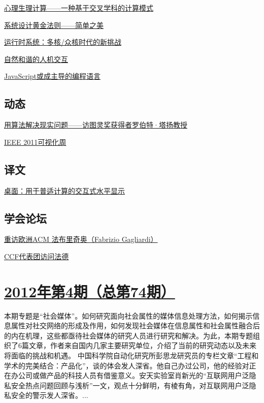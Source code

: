 \documentclass[a4paper]{article}
\begin{document}
\href{http://history.ccf.org.cn/resources/1190201776262/2012/05/18/12.pdf}{心理生理计算——一种基于交叉学科的计算模式}

\href{http://history.ccf.org.cn/resources/1190201776262/2012/05/18/9.pdf}{系统设计黄金法则——简单之美}

\href{http://history.ccf.org.cn/resources/1190201776262/2012/05/18/10.pdf}{运行时系统：多核/众核时代的新挑战}

\href{http://history.ccf.org.cn/resources/1190201776262/2012/05/18/11.pdf}{自然和谐的人机交互}

\href{http://history.ccf.org.cn/resources/1190201776262/2012/05/18/13.pdf}{JavaScript或成主导的编程语言}

\subsection{动态}
\href{http://history.ccf.org.cn/resources/1190201776262/2012/05/18/14.pdf}{用算法解决现实问题——访图灵奖获得者罗伯特·塔扬教授}

\href{http://history.ccf.org.cn/resources/1190201776262/2012/05/18/15.pdf}{IEEE 2011可视化周}

\subsection{译文}
\href{http://history.ccf.org.cn/resources/1190201776262/2012/05/18/16.pdf}{桌面：用于普适计算的交互式水平显示}

\subsection{学会论坛}
\href{http://history.ccf.org.cn/resources/1190201776262/2012/05/18/17.pdf}{重访欧洲ACM  法布里奇奥（Fabrizio Gagliardi）}

\href{http://history.ccf.org.cn/resources/1190201776262/2012/05/18/18.pdf}{CCF代表团访问法德}


\section{\href{http://history.ccf.org.cn/sites/ccf/jsjtbbd.jsp?contentId=2669042924594}{\textbf{2012年第4期（总第74期）}}}
本期专题是“社会媒体”。如何研究面向社会属性的媒体信息处理方法，如何揭示信息属性对社交网络的形成及作用，如何发现社会媒体在信息属性和社会属性融合后的内在机理，这些都亟待社会媒体的研究人员进行研究和解决。为此，本期专题组织了6篇文章，作者来自国内几家主要研究单位，介绍了当前的研究动态以及未来将面临的挑战和机遇。
中国科学院自动化研究所彭思龙研究员的专栏文章“工程和学术的完美结合：产品化”，谈的体会发人深省。他自己办过公司，他的经验对正在办公司或做产品的科技人员有借鉴意义。安天实验室肖新光的“互联网用户泛隐私安全热点问题回顾与浅析”一文，观点十分鲜明，有棱有角，对互联网用户泛隐私安全的警示发人深省。...
\end{document}
